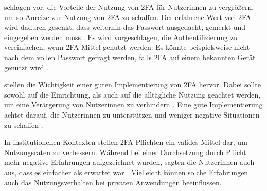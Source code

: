\pskip
\textcite{dasWhyJohnny2018} schlagen vor, die Vorteile der Nutzung von \ac{2FA} für Nutzerinnen zu vergrößern, um so Anreize zur Nutzung von \ac{2FA} zu schaffen. Der erfahrene Wert von \ac{2FA} wird dadurch gesenkt, dass weiterhin das Passwort ausgedacht, gemerkt und eingegeben werden muss \parencite{dasWhyJohnny2018}. Es wird vorgeschlagen, die Authentifizierung zu vereinfachen, wenn \ac{2FA}-Mittel genutzt werden: Es könnte beispielsweise nicht nach dem vollen Passwort gefragt werden, falls \ac{2FA} auf einem bekannten Gerät genutzt wird \parencite{dasWhyJohnny2018}.

\pskip
\textcite{colnagoItsNot2018} stellen die Wichtigkeit einer guten Implementierung von \ac{2FA} hervor. Dabei sollte sowohl auf die Einrichtung, als auch auf die alltägliche Nutzung geachtet werden, um eine Verärgerung von Nutzerinnen zu verhindern \parencite{colnagoItsNot2018}. Eine gute Implementierung achtet darauf, die Nutzerinnen zu unterstützen und weniger negative Situationen zu schaffen \parencite{colnagoItsNot2018}.

In institutionellen Kontexten stellen \ac{2FA}-Pflichten ein valides Mittel dar, um Nutzungsraten zu verbessern. Während bei einer Durchsetzung durch Pflicht mehr negative Erfahrungen aufgezeichnet wurden, sagten die Nutzerinnen auch aus, dass es einfacher als erwartet war \parencite{colnagoItsNot2018}. Vielleicht können solche Erfahrungen auch das Nutzungsverhalten bei privaten Anwendungen beeinflussen.
